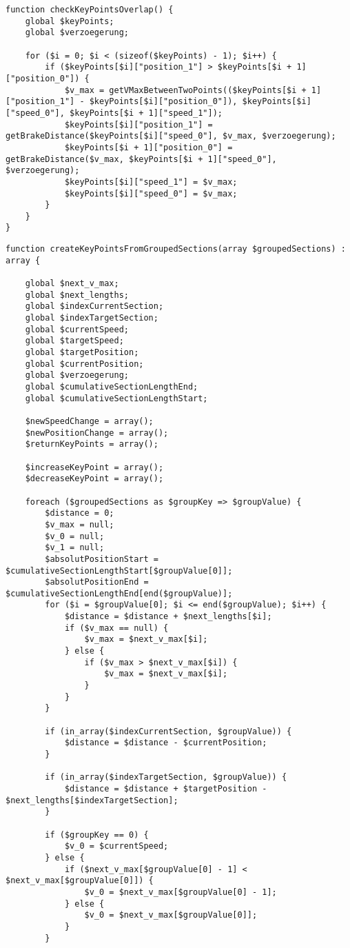 \begin{lstlisting}
function checkKeyPointsOverlap() {
	global $keyPoints;
	global $verzoegerung;

	for ($i = 0; $i < (sizeof($keyPoints) - 1); $i++) {
		if ($keyPoints[$i]["position_1"] > $keyPoints[$i + 1]["position_0"]) {
			$v_max = getVMaxBetweenTwoPoints(($keyPoints[$i + 1]["position_1"] - $keyPoints[$i]["position_0"]), $keyPoints[$i]["speed_0"], $keyPoints[$i + 1]["speed_1"]);
			$keyPoints[$i]["position_1"] = getBrakeDistance($keyPoints[$i]["speed_0"], $v_max, $verzoegerung);
			$keyPoints[$i + 1]["position_0"] = getBrakeDistance($v_max, $keyPoints[$i + 1]["speed_0"], $verzoegerung);
			$keyPoints[$i]["speed_1"] = $v_max;
			$keyPoints[$i]["speed_0"] = $v_max;
		}
	}
}
\end{lstlisting}

\begin{lstlisting}
function createKeyPointsFromGroupedSections(array $groupedSections) : array {

	global $next_v_max;
	global $next_lengths;
	global $indexCurrentSection;
	global $indexTargetSection;
	global $currentSpeed;
	global $targetSpeed;
	global $targetPosition;
	global $currentPosition;
	global $verzoegerung;
	global $cumulativeSectionLengthEnd;
	global $cumulativeSectionLengthStart;

	$newSpeedChange = array();
	$newPositionChange = array();
	$returnKeyPoints = array();

	$increaseKeyPoint = array();
	$decreaseKeyPoint = array();

	foreach ($groupedSections as $groupKey => $groupValue) {
		$distance = 0;
		$v_max = null;
		$v_0 = null;
		$v_1 = null;
		$absolutPositionStart = $cumulativeSectionLengthStart[$groupValue[0]];
		$absolutPositionEnd = $cumulativeSectionLengthEnd[end($groupValue)];
		for ($i = $groupValue[0]; $i <= end($groupValue); $i++) {
			$distance = $distance + $next_lengths[$i];
			if ($v_max == null) {
				$v_max = $next_v_max[$i];
			} else {
				if ($v_max > $next_v_max[$i]) {
					$v_max = $next_v_max[$i];
				}
			}
		}

		if (in_array($indexCurrentSection, $groupValue)) {
			$distance = $distance - $currentPosition;
		}

		if (in_array($indexTargetSection, $groupValue)) {
			$distance = $distance + $targetPosition - $next_lengths[$indexTargetSection];
		}

		if ($groupKey == 0) {
			$v_0 = $currentSpeed;
		} else {
			if ($next_v_max[$groupValue[0] - 1] < $next_v_max[$groupValue[0]]) {
				$v_0 = $next_v_max[$groupValue[0] - 1];
			} else {
				$v_0 = $next_v_max[$groupValue[0]];
			}
		}


\end{lstlisting}
